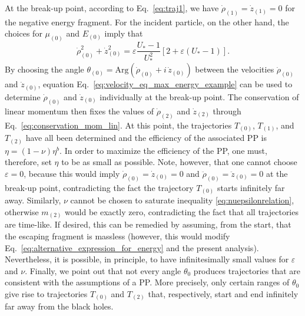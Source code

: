 At the break-up point, according to Eq.~\eqref{eq:traj1}, we have $\dot \rho_{(1)}=\dot z_{(1)} = 0$ for the negative energy fragment. For the incident particle, on the other hand, the choices for $\mu_{(0)}$ and $E_{(0)}$ imply that
%
\begin{equation}\label{eq:velocity_eq_max_energy_example}
  \dot \rho_{(0)} ^2 + \dot z_{(0)} ^2 = \varepsilon \frac{U_*-1}{U_* ^2} \left[2 + \varepsilon (U_* - 1) \right].
\end{equation}
%
By choosing the angle $\theta_{(0)} = \mathrm{Arg}\left(\dot \rho_{(0)} + i \, \dot z_{(0)} \right)$ between the velocities $\dot \rho_{(0)}$ and $\dot z_{(0)}$, equation Eq.~\eqref{eq:velocity_eq_max_energy_example} can be used to determine $\dot \rho_{(0)}$ and $\dot z_{(0)}$ individually at the break-up point. The conservation of linear momentum then fixes the values of $\dot \rho_{(2)}$ and $\dot z_{(2)}$ through Eq.~\eqref{eq:conservation_mom_lin}. At this point, the trajectories $T_{(0)}$, $T_{(1)}$, and $T_{(2)}$ have all been determined and the efficiency of the associated PP is $\eta=(1-\nu)\eta^{b}$.  In order to maximize the efficiency of the PP, one must, therefore, set $\eta$ to be as small as possible. Note, however, that one cannot choose $\varepsilon=0$, because this would imply $\dot \rho_{(0)} = \dot z_{(0)} = 0$ and  $\ddot \rho_{(0)} = \ddot z_{(0)} = 0$ at the break-up point, contradicting the fact the trajectory $T_{(0)}$ starts infinitely far away. Similarly, $\nu$ cannot be chosen to saturate inequality \eqref{eq:nuepsilonrelation}, otherwise $m_{(2)}$ would be exactly zero, contradicting the fact that all trajectories are time-like. If desired, this can be remedied by assuming, from the start, that the escaping fragment is massless (however, this would modify Eq.~\eqref{eq:alternative_expression_for_energy} and the present analysis). Nevertheless, it is possible, in principle, to have infinitesimally small values for $\varepsilon$ and $\nu$. Finally, we point out that not every angle $\theta_0$ produces trajectories that are consistent with the assumptions of a PP. More precisely, only certain ranges of $\theta_0$ give rise to trajectories  $T_{(0)}$ and $T_{(2)}$ that, respectively, start and end infinitely far away from the black holes.

